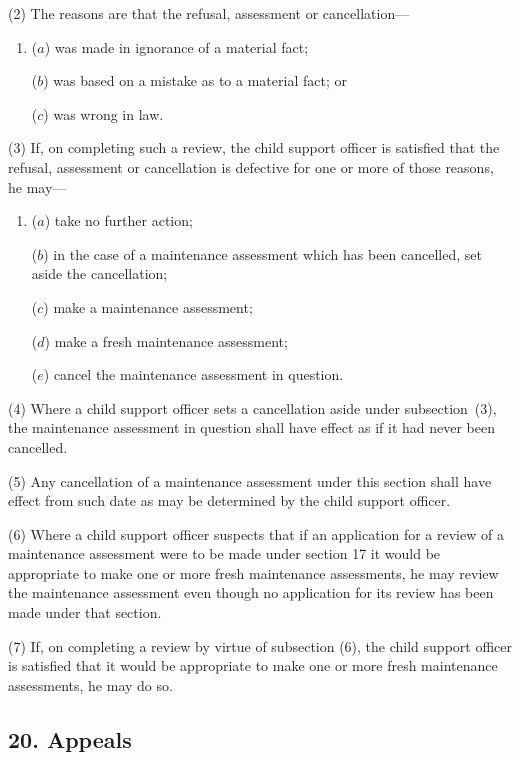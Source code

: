 \documentclass[12pt,a4paper]{article}
\begin{document}
(2) The reasons are that the refusal, assessment or cancellation—
\begin{enumerate}\item[]
($a$) was made in ignorance of a material fact;

($b$) was based on a mistake as to a material fact; or

($c$) was wrong in law.
\end{enumerate}

(3) If, on completing such a review, the child support officer is satisfied that the refusal, assessment or cancellation is defective for one or more of those reasons, he may—
\begin{enumerate}\item[]
($a$) take no further action;

($b$) in the case of a maintenance assessment which has been cancelled, set aside the cancellation;

($c$) make a maintenance assessment;

($d$) make a fresh maintenance assessment;

($e$) cancel the maintenance assessment in question.
\end{enumerate}

(4) Where a child support officer sets a cancellation aside under subsection~(3), the maintenance assessment in question shall have effect as if it had never been cancelled.

(5) Any cancellation of a maintenance assessment under this section shall have effect from such date as may be determined by the child support officer.

(6) Where a child support officer suspects that if an application for a review of a maintenance assessment were to be made under section 17 it would be appropriate to make one or more fresh maintenance assessments, he may review the maintenance assessment even though no application for its review has been made under that section.

(7) If, on completing a review by virtue of subsection (6), the child support officer is satisfied that it would be appropriate to make one or more fresh maintenance assessments, he may do so.


\subsection{20. Appeals}
\end{document}
